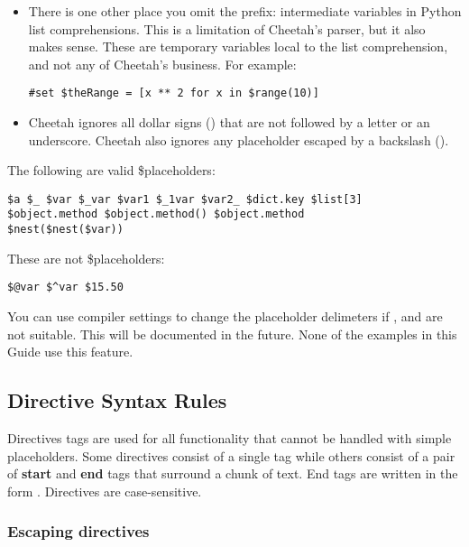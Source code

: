 \begin{itemize}
\item There is one other place you omit the \code{\$} prefix: intermediate
     variables in Python list comprehensions.  This is a limitation of
     Cheetah's parser, but it also makes sense.  These are temporary variables
     local to the list comprehension,  and not any of Cheetah's business.  For
     example:
\begin{verbatim}
#set $theRange = [x ** 2 for x in $range(10)]
\end{verbatim}
\item Cheetah ignores all dollar signs (\code{\$}) that are not followed by a
     letter or an underscore.  Cheetah also ignores any placeholder escaped by a
     backslash ().

\end{itemize} 

The following are valid \$placeholders:
\begin{verbatim}
$a $_ $var $_var $var1 $_1var $var2_ $dict.key $list[3]
$object.method $object.method() $object.method
$nest($nest($var))
\end{verbatim}

These are not \$placeholders:
\begin{verbatim}
$@var $^var $15.50
\end{verbatim}

You can use compiler settings to change the placeholder delimeters if
\code{\$}, \code{\{} and \code{\}} are not suitable.  This will be documented
in the future.  None of the examples in this Guide use this feature.

\subsection{Directive Syntax Rules}
\label{language.directives}

Directives tags are used for all functionality that cannot be handled with
simple placeholders. Some directives consist of a single tag while others
consist of a pair of {\bf start} and {\bf end} tags that surround a chunk of
text.  End tags are written in the form .
Directives are case-sensitive.

\subsubsection{Escaping directives}
\label{language.directives.escaping}

